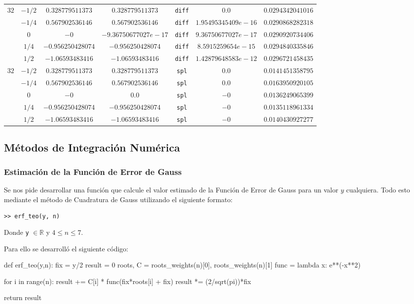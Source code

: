 \documentclass[12pt,letterpaper]{article}
\begin{document}
\begin{table}
\begin{center}
\begin{tabular}{|c|c|c|c|c|c|c|}
		\multirow{5}{*}{$32$}
			& $-1/2$ & $0.328779511373$ & $0.328779511373$ & \verb+diff+ & $0.0$ & $0.0294342041016$ \\
			& $-1/4$ & $0.567902536146$ & $0.567902536146$ & \verb+diff+ & $1.95495345409e-16$ & $0.0290868282318$ \\
			& $0$ & $-0$ & $-9.36750677027e-17$ & \verb+diff+ & $9.36750677027e-17$ & $0.0290920734406$ \\
			& $1/4$ & $-0.956250428074$ & $-0.956250428074$ & \verb+diff+ & $8.5915259654e-15$ & $0.0294840335846$ \\
			& $1/2$ & $-1.06593483416$ & $-1.06593483416$ & \verb+diff+ & $1.42879648583e-12$ & $0.0296721458435$ \\
		\hline
		\multirow{5}{*}{$32$}
			& $-1/2$ & $0.328779511373$ & $0.328779511373$ & \verb+spl+ & $0.0$ & $0.0141451358795$ \\
			& $-1/4$ & $0.567902536146$ & $0.567902536146$ & \verb+spl+ & $0.0$ & $0.0163950920105$ \\
			& $0$ & $-0$ & $0.0$ & \verb+spl+ & $-0$ & $0.0136249065399$ \\
			& $1/4$ & $-0.956250428074$ & $-0.956250428074$ & \verb+spl+ & $-0$ & $0.0135118961334$ \\
			& $1/2$ & $-1.06593483416$ & $-1.06593483416$ & \verb+spl+ & $-0$ & $0.0140430927277$ \\
		\hline
	\end{tabular}
\end{center}
\end{table}

\subsection{Métodos de Integración Numérica}
\subsubsection{Estimación de la Función de Error de Gauss}
Se nos pide desarrollar una función que calcule el valor estimado de la Función de Error de Gauss para un valor $y$ cualquiera. Todo esto mediante el método de Cuadratura de Gauss utilizando el siguiente formato:
\begin{center}
\verb+>> erf_teo(y, n)+
\end{center}

Donde \verb+y+ $\in \mathbb{R}$ y $4 \leq n \leq 7$.

Para ello se desarrolló el siguiente código:
\begin{verbatimtab}[4]
def erf_teo(y,n):
	fix = y/2
	result = 0
	roots, C = roots_weights(n)[0], roots_weights(n)[1]
	func = lambda x: e**(-x**2)
	
	for i in range(n):
		result += C[i] * func(fix*roots[i] + fix)
	result *= (2/sqrt(pi))*fix
	
	return result
\end{verbatimtab}
\end{document}
